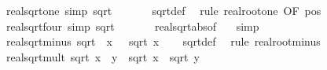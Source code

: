 \begin{isabellebody}
\ real{\isacharunderscore}{\kern0pt}sqrt{\isacharunderscore}{\kern0pt}one\ {\isacharbrackleft}{\kern0pt}simp{\isacharbrackright}{\kern0pt}{\isacharcolon}{\kern0pt}\ {\isachardoublequoteopen}sqrt\ {}\ {\isacharequal}{\kern0pt}\ {}{\isachardoublequoteclose}\isanewline
%
\isadelimproof
\ \ %
\endisadelimproof
%
\isatagproof
{}\isamarkupfalse%
\ sqrt{\isacharunderscore}{\kern0pt}def\ \isamarkupfalse%
\ {\isacharparenleft}{\kern0pt}rule\ real{\isacharunderscore}{\kern0pt}root{\isacharunderscore}{\kern0pt}one\ {\isacharbrackleft}{\kern0pt}OF\ pos{}{\isacharbrackright}{\kern0pt}{\isacharparenright}{\kern0pt}%
\endisatagproof
{\isafoldproof}%
%
\isadelimproof
\isanewline
%
\endisadelimproof
\isanewline
{}\isamarkupfalse%
\ real{\isacharunderscore}{\kern0pt}sqrt{\isacharunderscore}{\kern0pt}four\ {\isacharbrackleft}{\kern0pt}simp{\isacharbrackright}{\kern0pt}{\isacharcolon}{\kern0pt}\ {\isachardoublequoteopen}sqrt\ {}\ {\isacharequal}{\kern0pt}\ {}{\isachardoublequoteclose}\isanewline
%
\isadelimproof
\ \ %
\endisadelimproof
%
\isatagproof
{}\isamarkupfalse%
\ real{\isacharunderscore}{\kern0pt}sqrt{\isacharunderscore}{\kern0pt}abs{\isacharbrackleft}{\kern0pt}of\ {}{\isacharbrackright}{\kern0pt}\ \isamarkupfalse%
\ simp%
\endisatagproof
{\isafoldproof}%
%
\isadelimproof
\isanewline
%
\endisadelimproof
\isanewline
{}\isamarkupfalse%
\ real{\isacharunderscore}{\kern0pt}sqrt{\isacharunderscore}{\kern0pt}minus{\isacharcolon}{\kern0pt}\ {\isachardoublequoteopen}sqrt\ {\isacharparenleft}{\kern0pt}{\isacharminus}{\kern0pt}\ x{\isacharparenright}{\kern0pt}\ {\isacharequal}{\kern0pt}\ {\isacharminus}{\kern0pt}\ sqrt\ x{\isachardoublequoteclose}\isanewline
%
\isadelimproof
\ \ %
\endisadelimproof
%
\isatagproof
{}\isamarkupfalse%
\ sqrt{\isacharunderscore}{\kern0pt}def\ \isamarkupfalse%
\ {\isacharparenleft}{\kern0pt}rule\ real{\isacharunderscore}{\kern0pt}root{\isacharunderscore}{\kern0pt}minus{\isacharparenright}{\kern0pt}%
\endisatagproof
{\isafoldproof}%
%
\isadelimproof
\isanewline
%
\endisadelimproof
\isanewline
{}\isamarkupfalse%
\ real{\isacharunderscore}{\kern0pt}sqrt{\isacharunderscore}{\kern0pt}mult{\isacharcolon}{\kern0pt}\ {\isachardoublequoteopen}sqrt\ {\isacharparenleft}{\kern0pt}x\ {\isacharasterisk}{\kern0pt}\ y{\isacharparenright}{\kern0pt}\ {\isacharequal}{\kern0pt}\ sqrt\ x\ {\isacharasterisk}{\kern0pt}\ sqrt\ y{\isachardoublequoteclose}\isanewline

\end{isabellebody}
